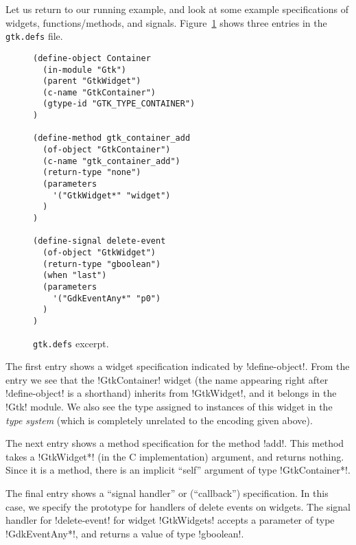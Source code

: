 \documentclass[finalversion]{usetex-v1}
\begin{document}
Let us return to our running example, and look at some example
specifications of widgets, functions/methods, and signals.
Figure~\ref{fig:gtk-defs} shows three entries in the \texttt{gtk.defs}
file.
\begin{figure}[htbp]
\begin{centering}
\begin{verbatim}
(define-object Container
  (in-module "Gtk")
  (parent "GtkWidget")
  (c-name "GtkContainer")
  (gtype-id "GTK_TYPE_CONTAINER")
)

(define-method gtk_container_add
  (of-object "GtkContainer")
  (c-name "gtk_container_add")
  (return-type "none")
  (parameters
    '("GtkWidget*" "widget")
  )
)

(define-signal delete-event
  (of-object "GtkWidget")
  (return-type "gboolean")
  (when "last")
  (parameters
    '("GdkEventAny*" "p0")
  )
)
\end{verbatim}
\caption{\texttt{gtk.defs} excerpt.\label{fig:gtk-defs}}
\end{centering}
\end{figure}
The first entry shows a widget specification indicated by
!define-object!. From the entry we see that the !GtkContainer! widget
(the name appearing right after !define-object! is a shorthand)
inherits from !GtkWidget!, and it belongs in the !Gtk! module.  We also
see the type assigned to instances of this widget in the \emph{\gtk type
system} (which is completely unrelated to the \sml encoding given
above).

The next entry shows a method specification for the method !add!.
This method takes a !GtkWidget*! (in the C implementation)
argument, and returns nothing. Since it is a method, there is an
implicit ``self'' argument of type !GtkContainer*!.

The final entry shows a ``signal handler'' or (``callback'')
specification. In this case, we specify the prototype for handlers of
delete events on widgets. The signal handler for !delete-event! for
widget !GtkWidgets! accepts a parameter of type !GdkEventAny*!, and
returns a value of type !gboolean!. 



\end{document}
